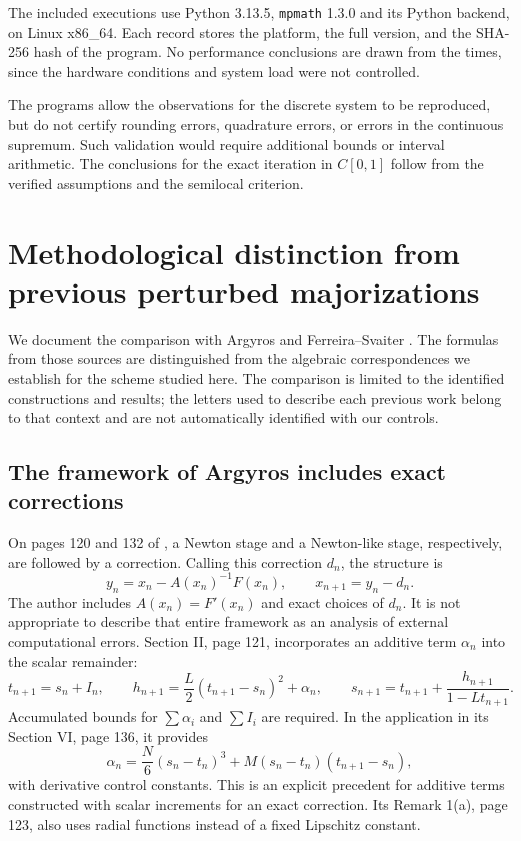 \documentclass[11pt,a4paper]{article}
\numberwithin{equation}{section}
\numberwithin{table}{section}
\theoremstyle{plain}
\theoremstyle{definition}\newtheorem{definition}[theorem]{Definition}
\theoremstyle{remark}\newtheorem{remark}[theorem]{Remark}
\begin{document}
The included executions use Python 3.13.5, \texttt{mpmath} 1.3.0 and
its Python backend, on Linux x86\_64. Each record stores the platform,
the full version, and the SHA-256 hash of the program. No performance
conclusions are drawn from the times, since the hardware conditions
and system load were not controlled.

The programs allow the observations for the discrete system to be
reproduced, but do not certify rounding errors, quadrature errors,
or errors in the continuous supremum. Such validation would require
additional bounds or interval arithmetic. The conclusions for the
exact iteration in $C[0,1]$ follow from the verified assumptions and
the semilocal criterion.


\section{Methodological distinction from previous perturbed majorizations}
\label{supp:perturbations}
We document the comparison with Argyros \cite{Argyros1996} and
Ferreira--Svaiter \cite{FerreiraSvaiter2012}. The formulas from
those sources are distinguished from the algebraic correspondences
we establish for the scheme studied here. The comparison is
limited to the identified constructions and results; the letters
used to describe each previous work belong to that context and
are not automatically identified with our controls.

\subsection{The framework of Argyros includes exact corrections}
On pages 120 and 132 of \cite{Argyros1996}, a Newton stage and a
Newton-like stage, respectively, are followed by a correction.
Calling this correction $d_n$, the structure is
\[
 y_n=x_n-A(x_n)^{-1}F(x_n),\qquad x_{n+1}=y_n-d_n.
\]
The author includes $A(x_n)=F'(x_n)$ and exact choices of $d_n$.
It is not appropriate to describe that entire framework as an
analysis of external computational errors.
Section II, page 121, incorporates an additive term $\alpha_n$
into the scalar remainder:
\[
 t_{n+1}=s_n+I_n,\qquad
 h_{n+1}=\frac L2(t_{n+1}-s_n)^2+\alpha_n,\qquad
 s_{n+1}=t_{n+1}+\frac{h_{n+1}}{1-Lt_{n+1}}.
\]
Accumulated bounds for $\sum\alpha_i$ and $\sum I_i$ are required.
In the application in its Section VI, page 136, it provides
\[
 \alpha_n=\frac N6(s_n-t_n)^3+M(s_n-t_n)(t_{n+1}-s_n),
\]
with derivative control constants. This is an explicit precedent
for additive terms constructed with scalar increments for an exact
correction. Its Remark 1(a), page 123, also uses radial functions
instead of a fixed Lipschitz constant.
\end{document}
